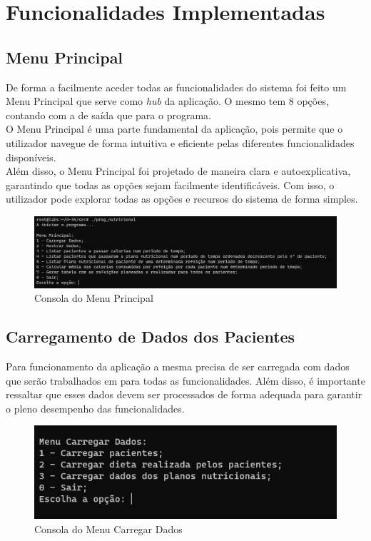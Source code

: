 \documentclass{article}
\begin{document}
\newpage



\newpage
\section{Funcionalidades Implementadas}

\subsection{Menu Principal}
De forma a facilmente aceder todas as funcionalidades do sistema foi feito um Menu Principal que serve como \emph{hub} da aplicação. O mesmo tem 8 opções, contando com a de saída que para o programa. \\O Menu Principal é uma parte fundamental da aplicação, pois permite que o utilizador navegue de forma intuitiva e eficiente pelas diferentes funcionalidades disponíveis. \\Além disso, o Menu Principal foi projetado de maneira clara e autoexplicativa, garantindo que todas as opções sejam facilmente identificáveis. Com isso, o utilizador pode explorar todas as opções e recursos do sistema de forma simples.\\

\begin{figure}[h]
    \centering
    \includegraphics[width=0.9\linewidth]{MenuPrincipal.png}
    \caption{Consola do Menu Principal}
    \label{fig+:enter-label}
\end{figure}

\subsection{Carregamento de Dados dos Pacientes}
Para funcionamento da aplicação a mesma precisa de ser carregada com dados que serão trabalhados em para todas as funcionalidades. Além disso, é importante ressaltar que esses dados devem ser processados de forma adequada para garantir o pleno desempenho das funcionalidades.

\begin{figure}[h]
    \centering
    \includegraphics[width=0.6\linewidth]{menuCarregarDados.png}
    \caption{Consola do Menu Carregar Dados}
    \label{fig:enter-label}
\end{figure}
\end{document}
